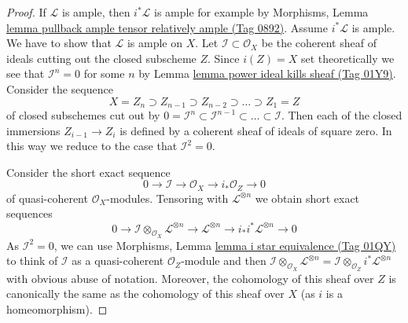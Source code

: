 \documentclass{amsart}
\theoremstyle{plain}
\theoremstyle{definition}
\theoremstyle{remark}
\numberwithin{equation}{subsection}
\begin{document}
\begin{proof}
If $\mathcal{L}$ is ample, then $i^*\mathcal{L}$ is ample for
example by Morphisms, Lemma
\href{https://stacks.math.columbia.edu/tag/0892}{lemma pullback ample tensor relatively ample (Tag 0892)}.
Assume $i^*\mathcal{L}$ is ample. We have to show that $\mathcal{L}$
is ample on $X$.
Let $\mathcal{I} \subset \mathcal{O}_X$ be the coherent sheaf of ideals
cutting out the closed subscheme $Z$. Since $i(Z) = X$ set theoretically
we see that $\mathcal{I}^n = 0$ for some $n$ by
Lemma \href{https://stacks.math.columbia.edu/tag/01Y9}{lemma power ideal kills sheaf (Tag 01Y9)}.
Consider the sequence
$$
X = Z_n \supset Z_{n - 1} \supset Z_{n - 2} \supset \ldots \supset Z_1 = Z
$$
of closed subschemes cut out by
$0 = \mathcal{I}^n \subset \mathcal{I}^{n - 1} \subset \ldots \subset
\mathcal{I}$. Then each of the closed immersions $Z_{i - 1} \to Z_{i}$
is defined by a coherent sheaf of ideals of square zero. In this way
we reduce to the case that $\mathcal{I}^2 = 0$.

\medskip\noindent
Consider the short exact sequence
$$
0 \to \mathcal{I} \to \mathcal{O}_X \to i_*\mathcal{O}_Z \to 0
$$
of quasi-coherent $\mathcal{O}_X$-modules. Tensoring with
$\mathcal{L}^{\otimes n}$ we obtain short exact sequences
\begin{equation}
\label{equation-ses}
0 \to \mathcal{I} \otimes_{\mathcal{O}_X} \mathcal{L}^{\otimes n}
\to \mathcal{L}^{\otimes n} \to i_*i^*\mathcal{L}^{\otimes n} \to 0
\end{equation}
As $\mathcal{I}^2 = 0$, we can use
Morphisms, Lemma \href{https://stacks.math.columbia.edu/tag/01QY}{lemma i star equivalence (Tag 01QY)}
to think of $\mathcal{I}$ as a quasi-coherent $\mathcal{O}_Z$-module
and then $\mathcal{I} \otimes_{\mathcal{O}_X} \mathcal{L}^{\otimes n} =
\mathcal{I} \otimes_{\mathcal{O}_Z} i^*\mathcal{L}^{\otimes n}$ with
obvious abuse of notation.
Moreover, the cohomology of this sheaf over $Z$ is canonically
the same as the cohomology of this sheaf over $X$ (as $i$ is a
homeomorphism).


\end{proof}
\end{document}
